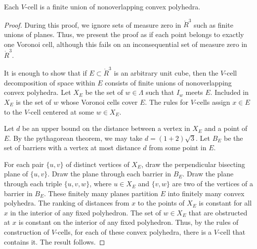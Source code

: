 \begin{lemma}\label{lemma:V-convex}
Each $V$-cell is a finite union of nonoverlapping convex polyhedra.
\end{lemma}

\begin{proof}
During this proof, we ignore sets of measure zero in $\ring{R}^3$
such as finite unions of planes.  Thus, we present the proof as if
each point belongs to exactly one Voronoi cell, although this
fails on an inconsequential set of measure zero in $\ring{R}^3$.

It is enough to show that if $E\subset\ring{R}^3$ is an arbitrary
unit cube, then the $V$-cell decomposition of space within $E$
consists of finite unions of nonoverlapping convex polyhedra. Let
$X_E$ be the set of $w\in\Lambda$ such that $I_w$ meets $E$.
Included in $X_E$ is the set of $w$ whose Voronoi cells cover $E$.
The rules for $V$-cells assign $x\in E$ to the $V$-cell centered at
some $w\in X_E$.

Let $d$ be an upper bound on the distance between a vertex in
$X_E$ and a point of $E$. By the pythagorean theorem, we may take
$d=(1+2)\sqrt3$.  Let $B_E$ be the set of barriers with a vertex
at most distance $d$ from some point in $E$.

For each pair $\{u,v\}$ of distinct vertices of $X_E$, draw the
perpendicular bisecting plane of $\{u,v\}$.  Draw the plane
through each barrier in $B_E$. Draw the plane through each triple
$\{u,v,w\}$, where $u\in X_E$ and $\{v,w\}$ are two of the
vertices of a barrier in $B_E$. These finitely many planes
partition $E$ into finitely many convex polyhedra. The ranking of
distances from $x$ to the points of $X_E$ is constant for all $x$
in the interior of any fixed polyhedron.  The set of $w\in X_E$
that are obstructed at $x$ is constant on the interior of any
fixed polyhedron.  Thus, by the rules of construction of
$V$-cells, for each of these convex polyhedra, there is a $V$-cell
that contains it.  The result follows.
\end{proof}

